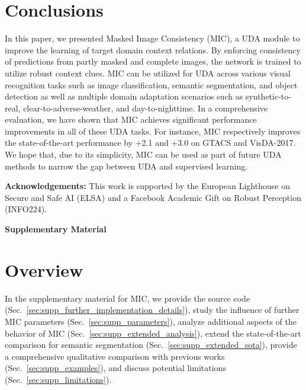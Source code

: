 \documentclass[10pt,twocolumn,letterpaper]{article}
\begin{document}
 
\section{Conclusions}
\label{sec:conclusions}

In this paper, we presented Masked Image Consistency (MIC), a UDA module to improve the learning of target domain context relations. By enforcing consistency of predictions from partly masked and complete images, the network is trained to utilize robust context clues. 
MIC can be utilized for UDA across various visual recognition tasks such as image classification, semantic segmentation, and object detection as well as multiple domain adaptation scenarios such as synthetic-to-real, clear-to-adverse-weather, and day-to-nighttime. In a comprehensive evaluation, we have shown that MIC achieves significant performance improvements in all of these UDA tasks. For instance, MIC respectively improves the state-of-the-art performance by +2.1 and +3.0 on GTACS and VisDA-2017. We hope that, due to its simplicity, MIC can be used as part of future UDA methods to narrow the gap between UDA and supervised learning.
 
\noindent\textbf{Acknowledgements:} This work is supported by the European Lighthouse on Secure and Safe AI (ELSA) and a Facebook Academic Gift on Robust Perception (INFO224).

{\small


}

\clearpage



\noindent\textbf{\Large Supplementary Material}


\makeatletter
\renewcommand{\theHsection}{papersection.\number\value{section}} \renewcommand{\thesection}{\Alph{section}}
\renewcommand{\thefigure}{S\arabic{figure}}
\renewcommand{\thetable}{S\arabic{table}}
\setcounter{section}{0}

\setcounter{figure}{0}
\setcounter{table}{0}
\makeatother

\section{Overview}

In the supplementary material for MIC, we provide the source code (Sec.~\ref{sec:supp_further_implementation_details}), study the influence of further MIC parameters (Sec.~\ref{sec:supp_parameters}), analyze additional aspects of the behavior of MIC (Sec.~\ref{sec:supp_extended_analysis}), extend the state-of-the-art comparison for semantic segmentation (Sec.~\ref{sec:supp_extended_sota}), provide a comprehensive qualitative comparison with previous works (Sec.~\ref{sec:supp_examples}), and discuss potential limitations (Sec.~\ref{sec:supp_limitations}).
\end{document}
